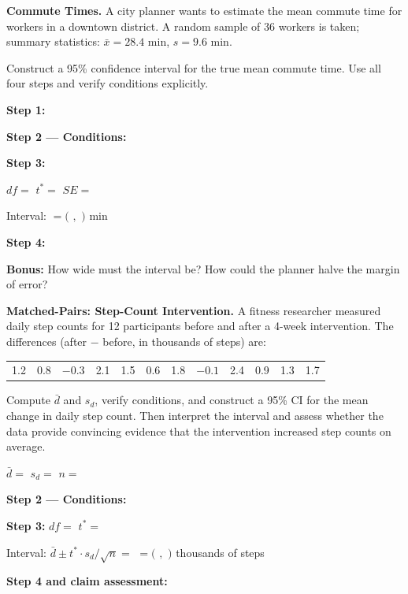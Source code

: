 \documentclass[10pt]{article}
\begin{document}
\begin{tcolorbox}[colback=white, colframe=black!40, title=\textbf{Tier A --- Approaching Proficiency},
    fonttitle=\bfseries, arc=2mm, left=3mm, right=3mm, top=2mm, bottom=2mm]

\textbf{Commute Times.} A city planner wants to estimate the mean commute time for
workers in a downtown district. A random sample of 36 workers is taken; summary
statistics: $\bar x = 28.4$ min, $s = 9.6$ min.

Construct a 95\% confidence interval for the true mean commute time. Use all four
steps and verify conditions explicitly.

\vspace{0.1in}
\textbf{Step 1:} \writeline

\textbf{Step 2 --- Conditions:} 

\textbf{Step 3:}

$df = $ \blank{2cm} \quad $t^* = $ \blank{2.5cm} \quad $SE = $ \blank{2.5cm}

Interval: \blank{10cm} $= ($ \blank{2cm} $,$ \blank{2cm} $)$ min

\textbf{Step 4:} 

\vspace{0.05in}
\textbf{Bonus:} How wide must the interval be? How could the planner halve the margin
of error? 

\end{tcolorbox}

\begin{tcolorbox}[colback=white, colframe=black!40, title=\textbf{Tier E --- Extension},
    fonttitle=\bfseries, arc=2mm, left=3mm, right=3mm, top=2mm, bottom=2mm]

\textbf{Matched-Pairs: Step-Count Intervention.} A fitness researcher measured daily
step counts for 12 participants before and after a 4-week intervention. The differences
(after $-$ before, in thousands of steps) are:

\medskip
\begin{center}
\begin{tabular}{cccccccccccc}
1.2 & 0.8 & $-0.3$ & 2.1 & 1.5 & 0.6 & 1.8 & $-0.1$ & 2.4 & 0.9 & 1.3 & 1.7
\end{tabular}
\end{center}
\medskip

Compute $\bar d$ and $s_d$, verify conditions, and construct a 95\% CI for the mean
change in daily step count. Then interpret the interval and assess whether the data
provide convincing evidence that the intervention increased step counts on average.

$\bar d = $ \blank{3cm} \quad $s_d = $ \blank{3cm} \quad $n = $ \blank{2cm}

\vspace{0.1in}
\textbf{Step 2 --- Conditions:} 

\textbf{Step 3:} $df = $ \blank{2cm} \quad $t^* = $ \blank{2.5cm}

Interval: $\bar d \pm t^* \cdot s_d/\sqrt{n} = $ \blank{8cm} $= ($ \blank{2cm} $,$ \blank{2cm} $)$ thousands of steps

\textbf{Step 4 and claim assessment:} 

\end{tcolorbox}
\end{document}
